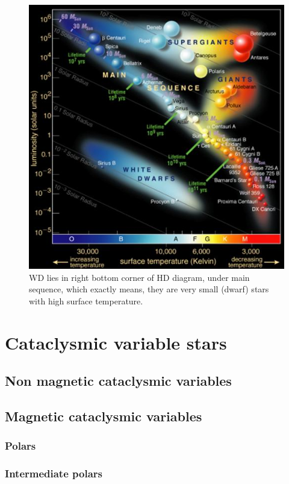 \documentclass[oneside,a4paper,11pt]{report}
\begin{document}
\begin{figure}[hbt!]
\centering
\includegraphics[totalheight=10cm]{hrdiagram}
\caption{WD lies in right bottom corner of HD diagram, under main 
sequence, which exactly means, they are very small (dwarf) stars with high surface temperature.  }
\label{hrd1} 
\end{figure}


\chapter{Cataclysmic variable stars}
\section{Non magnetic cataclysmic variables} 
\section{Magnetic cataclysmic variables}
\subsection{Polars}
\subsection{Intermediate polars}
\end{document}
